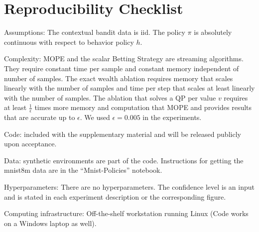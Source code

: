 \section{Reproducibility Checklist}
\begin{description}
\item Assumptions: The contextual bandit data is iid. 
The policy $\pi$ is absolutely 
continuous with respect to behavior policy $h$.
\item Complexity: MOPE and the scalar Betting Strategy are streaming algorithms. They require constant time per sample and constant memory
independent of number of samples. The exact wealth ablation requires
memory that scales linearly with the number of samples and time 
per step that scales at least linearly with the number of samples.
The ablation that solves a QP per value $v$ requires at least $\frac{1}{\epsilon}$ 
times more memory and computation that MOPE and provides 
results that are accurate up to $\epsilon$. We used 
$\epsilon=0.005$ in the experiments.
\item Code: included with the supplementary material and 
will be released publicly upon acceptance.
\item Data: synthetic environments are part of the code.
Instructions for getting the mnist8m data are in the 
``Mnist-Policies'' notebook.
\item Hyperparameters: There are no hyperparameters.
The confidence level is an input and is stated in each experiment
description or the corresponding figure.
\item Computing infrastructure: Off-the-shelf workstation running Linux
(Code works on a Windows laptop as well).
\end{description}
 